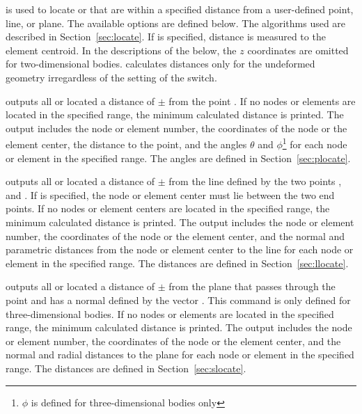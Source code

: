  {
 is used to locate  or  that are
within a specified distance from a user-defined point, line, or plane.
The available options are defined below.  The algorithms used are
described in Section~\ref{sec:locate}.  If  is specified,
distance is measured to the element centroid.  In the descriptions of
the  below, the $z$ coordinates are omitted for
two-dimensional bodies.   calculates distances only for the
undeformed geometry irregardless of the setting of the 
switch. 

 {
outputs all  or  located a
distance of $\pm$ from the
point .  If no nodes or elements are
located in the specified range, the minimum calculated distance
is printed.  The output includes the node or element number, the
coordinates of the node or the element center, the distance to the
point, and the angles $\theta$ and $\phi$\footnote{$\phi$ is defined for
three-dimensional bodies only} for each node or element in the specified
range.  The angles are defined in
Section~\ref{sec:plocate}. 
}

 {
outputs all  or  located a distance of
$\pm$ from the line defined by the two
points , and . If
 is specified, the node or element center must lie between
the two end points.  If no nodes or element centers are located in the
specified range, the minimum calculated distance is printed.  The output
includes the node or element number, the coordinates of the node or the
element center, and the normal and parametric distances from the node or
element center to the line for each node or element in the specified
range.  The distances are defined in Section~\ref{sec:llocate}. 
}

 {
outputs all  or  located a 
distance of $\pm$ from the plane that
passes through the point  and has a normal
defined by the vector . This command is only
defined for three-dimensional bodies.  If no nodes or elements are
located in the specified range, the minimum calculated distance is
printed.  The output includes the node or element number, the
coordinates of the node or the element center, and the normal and
radial distances to the plane for each node or element in the specified
range.  The distances are defined in
Section~\ref{sec:slocate}.
}
}


